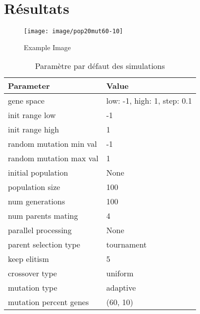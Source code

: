 \documentclass[journal, a4paper]{IEEEtran}
\begin{document}
\section{Résultats}
	\begin{figure}
	  \centering
	  \texttt{[image: image/pop20mut60-10]}
	  \caption{Example Image}
	  \label{fig:example}
	\end{figure}

	\begin{table}[!hbt]
		\begin{center}
		\caption{Paramètre par défaut des simulations}
		\label{tab:simParameters}
		\begin{tabular}{|l|l|}
			\hline
			\textbf{Parameter} & \textbf{Value} \\
			\hline
			gene space & {low: -1, high: 1, step: 0.1} \\
			\hline
			init range low & -1 \\
			\hline
			init range high & 1 \\
			\hline
			random mutation min val & -1 \\
			\hline
			random mutation max val & 1 \\
			\hline
			initial population & None \\
			\hline
			population size & 100 \\
			\hline
			num generations & 100 \\
			\hline
			num parents mating & 4 \\
			\hline
			parallel processing & None \\
			\hline
			parent selection type & tournament \\
			\hline
			keep elitism & 5 \\
			\hline
			crossover type & uniform \\
			\hline
			mutation type & adaptive \\
			\hline
			mutation percent genes & (60, 10) \\
			\hline
			\end{tabular}
		\end{center}
	\end{table}
\end{document}
